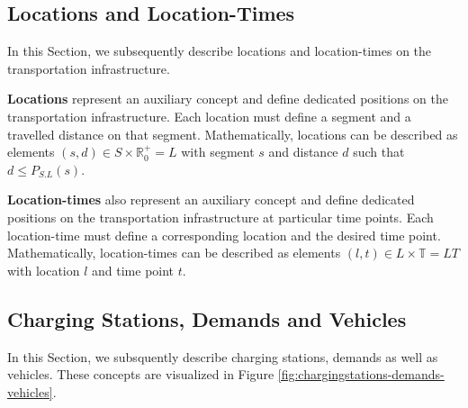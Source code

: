 \documentclass[graybox]{svmult}
\begin{document}
\subsection{Locations and Location-Times}
\label{sec:locations-locationtimes}	
In this Section, we subsequently describe locations and location-times on the transportation infrastructure.

\vspace{4mm}
\noindent
\textbf{Locations}
represent an auxiliary concept and define dedicated positions on the transportation infrastructure.
Each location must define a segment and a travelled distance on that segment.
Mathematically, locations can be described as elements $(s, d) \in S \times \mathbb{R}_0^+ = L$ with segment $s$ and distance $d$ such that $d \leq P_{S.L}(s)$.

\vspace{4mm}
\noindent
\textbf{Location-times}
 also represent an auxiliary concept and define dedicated positions on the transportation infrastructure at particular time points.
Each location-time must define a corresponding location and the desired time point.
Mathematically, location-times can be described as elements $(l, t) \in L \times \mathbb{T} = LT$ with location $l$ and time point $t$.
\vspace{-2mm}

\noindent
\subsection{Charging Stations, Demands and Vehicles}
\label{sec:chargingstations-demands-vehicles}	
In this Section, we subsquently describe charging stations, demands as well as vehicles. These concepts are visualized in Figure \ref{fig:chargingstations-demands-vehicles}.
\vspace{4mm}
\end{document}
